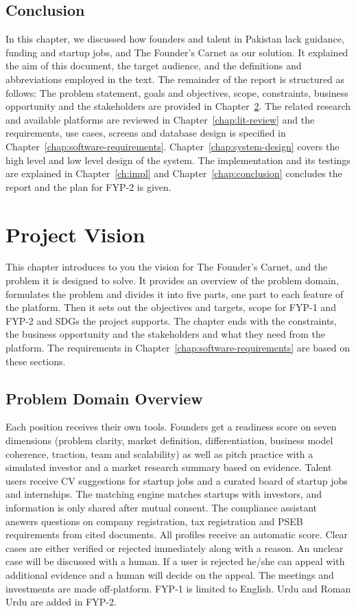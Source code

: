 \documentclass{FastFyp}
\begin{document}
\section{Conclusion}
In this chapter, we discussed how founders and talent in Pakistan lack guidance, funding and startup jobs, and The Founder's Carnet as our solution. It explained the aim of this document, the target audience, and the definitions and abbreviations employed in the text. The remainder of the report is structured as follows: The problem statement, goals and objectives, scope, constraints, business opportunity and the stakeholders are provided in Chapter~\ref{chap:vision}. The related research and available platforms are reviewed in Chapter~\ref{chap:lit-review} and the requirements, use cases, screens and database design is specified in Chapter~\ref{chap:software-requirements}. Chapter~\ref{chap:system-design} covers the high level and low level design of the system. The implementation and its testings are explained in Chapter~\ref{ch:impl} and Chapter~\ref{chap:conclusion} concludes the report and the plan for FYP-2 is given.

\chapter{Project Vision}\label{chap:vision}
This chapter introduces to you the vision for The Founder's Carnet, and the problem it is designed to solve. It provides an overview of the problem domain, formulates the problem and divides it into five parts, one part to each feature of the platform. Then it sets out the objectives and targets, scope for FYP-1 and FYP-2 and SDGs the project supports. The chapter ends with the constraints, the business opportunity and the stakeholders and what they need from the platform. The requirements in Chapter~\ref{chap:software-requirements} are based on these sections.

\section{Problem Domain Overview}
Each position receives their own tools. Founders get a readiness score on seven dimensions (problem clarity, market definition, differentiation, business model coherence, traction, team and scalability) as well as pitch practice with a simulated investor and a market research summary based on evidence. Talent users receive CV suggestions for startup jobs and a curated board of startup jobs and internships. The matching engine matches startups with investors, and information is only shared after mutual consent. The compliance assistant answers questions on company registration, tax registration and PSEB requirements from cited documents. All profiles receive an automatic score. Clear cases are either verified or rejected immediately along with a reason. An unclear case will be discussed with a human. If a user is rejected he/she can appeal with additional evidence and a human will decide on the appeal. The meetings and investments are made off-platform. FYP-1 is limited to English. Urdu and Roman Urdu are added in FYP-2.
\end{document}
